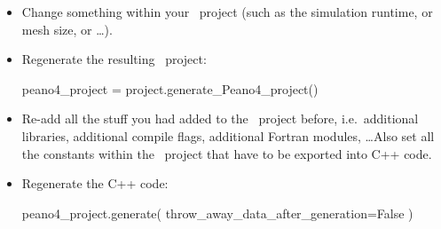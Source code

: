 \begin{itemize}
  \item Change something within your \ExaHyPE\ project (such as the simulation
  runtime, or mesh size, or \ldots).
  \item Regenerate the resulting \Peano\ project: 
  \begin{code}
peano4_project = project.generate_Peano4_project()
  \end{code}
  \item Re-add all the stuff you had added to the \Peano\ project before,
  i.e.~additional libraries, additional compile flags, additional
  Fortran modules, \ldots Also set all the constants within the \Peano\ project
  that have to be exported into C++ code.
  \item Regenerate the C++ code:
  \begin{code}
peano4_project.generate( throw_away_data_after_generation=False )  
  \end{code}
\end{itemize}


